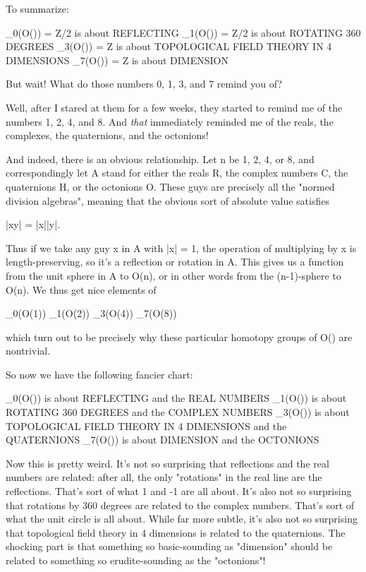 To summarize: 

\pi _{0}(O(\infty )) = Z/2  is about REFLECTING
\pi _{1}(O(\infty )) = Z/2  is about ROTATING 360 DEGREES
\pi _{3}(O(\infty )) = Z    is about TOPOLOGICAL FIELD THEORY IN 4 DIMENSIONS
\pi _{7}(O(\infty )) = Z    is about DIMENSION

But wait!  What do those numbers 0, 1, 3, and 7 remind you of?  

Well, after I stared at them for a few weeks, they started to remind
me of the numbers 1, 2, 4, and 8.  And \emph{that} immediately reminded me
of the reals, the complexes, the quaternions, and the octonions!  

And indeed, there is an obvious relationship.  Let n be 1, 2, 4, or 8,
and correspondingly let A stand for either the reals R, the complex
numbers C, the quaternions H, or the octonions O.  These guys are
precisely all the "normed division algebras", meaning that the obvious
sort of absolute value satisfies

|xy| = |x||y|.

Thus if we take any guy x in A with |x| = 1, the operation
of multiplying by x is length-preserving, so it's a reflection or 
rotation in A.  This gives us a function from the unit sphere in
A to O(n), or in other words from the (n-1)-sphere to O(n).  We thus
get nice elements of

\pi _{0}(O(1))
\pi _{1}(O(2))
\pi _{3}(O(4))
\pi _{7}(O(8))

which turn out to be precisely why these particular homotopy groups
of O(\infty ) are nontrivial.

So now we have the following fancier chart:

\pi _{0}(O(\infty )) is about REFLECTING and the REAL NUMBERS
\pi _{1}(O(\infty )) is about ROTATING 360 DEGREES and the COMPLEX NUMBERS
\pi _{3}(O(\infty )) is about TOPOLOGICAL FIELD THEORY IN 4 DIMENSIONS and the
                           QUATERNIONS
\pi _{7}(O(\infty )) is about DIMENSION and the OCTONIONS

Now this is pretty weird.  It's not so surprising that reflections and the
real numbers are related: after all, the only "rotations" in the real
line are the reflections.  That's sort of what 1 and -1 are all about.
It's also not so surprising that rotations by 360 degrees are related to
the complex numbers.  That's sort of what the unit circle is all
about.  While far more subtle, it's also not so surprising that
topological field theory in 4 dimensions is related to the quaternions.  
The shocking part is that something so basic-sounding as "dimension"
should be related to something so erudite-sounding as the "octonions"!

